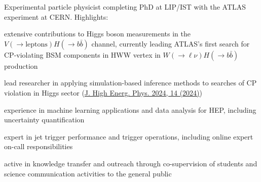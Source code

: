 
Experimental particle physicist completing PhD at LIP/IST with the ATLAS experiment at CERN. Highlights:\\

\begin{cvitems}
    \item extensive contributions to Higgs boson measurements in the $V(\to \textrm{leptons}) H(\to b\bar{b})$ channel, currently leading ATLAS's first search for CP-violating BSM components in HWW vertex in $W(\to \ell \nu) H(\to b\bar{b})$ production
    \item lead researcher in applying simulation-based inference methods to searches of CP violation in Higgs sector (\href{https://doi.org/10.1007/JHEP04(2024)014}{J. High Energ. Phys. 2024, 14 (2024)})
    \item experience in machine learning applications and data analysis for HEP, including uncertainty quantification
    \item expert in jet trigger performance and trigger operations, including online expert on-call responsibilities
    \item active in knowledge transfer and outreach through co-supervision of students and science communication activities to the general public
    \item[]
\end{cvitems}
